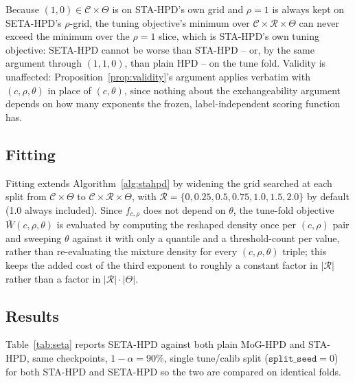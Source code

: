 \documentclass[10pt,twocolumn,a4paper]{article}
\begin{document}
Because $(1,0)\in\mathcal C\times\Theta$ is on STA-HPD's own grid and $\rho=1$ is always kept on
SETA-HPD's $\rho$-grid, the tuning objective's minimum over $\mathcal C\times\mathcal R\times\Theta$
can never exceed the minimum over the $\rho=1$ slice, which is STA-HPD's own tuning objective: SETA-HPD
cannot be worse than STA-HPD -- or, by the same argument through $(1,1,0)$, than plain HPD -- on the
tune fold. Validity is unaffected: Proposition~\ref{prop:validity}'s argument applies verbatim with
$(c,\rho,\theta)$ in place of $(c,\theta)$, since nothing about the exchangeability argument depends
on how many exponents the frozen, label-independent scoring function has.

\subsection{Fitting}
Fitting extends Algorithm~\ref{alg:stahpd} by widening the grid searched at each split from
$\mathcal C\times\Theta$ to $\mathcal C\times\mathcal R\times\Theta$, with $\mathcal R=\{0,0.25,0.5,
0.75,1.0,1.5,2.0\}$ by default (1.0 always included). Since $f_{c,\rho}$ does not depend on $\theta$,
the tune-fold objective $\bar W(c,\rho,\theta)$ is evaluated by computing the reshaped density once
per $(c,\rho)$ pair and sweeping $\theta$ against it with only a quantile and a threshold-count per
value, rather than re-evaluating the mixture density for every $(c,\rho,\theta)$ triple; this keeps
the added cost of the third exponent to roughly a constant factor in $|\mathcal R|$ rather than a
factor in $|\mathcal R|\cdot|\Theta|$.

\subsection{Results}
Table~\ref{tab:seta} reports SETA-HPD against both plain MoG-HPD and STA-HPD, same checkpoints,
$1-\alpha=90\%$, single tune/calib split ($\texttt{split\_seed}=0$) for both STA-HPD and SETA-HPD so
the two are compared on identical folds.
\end{document}
